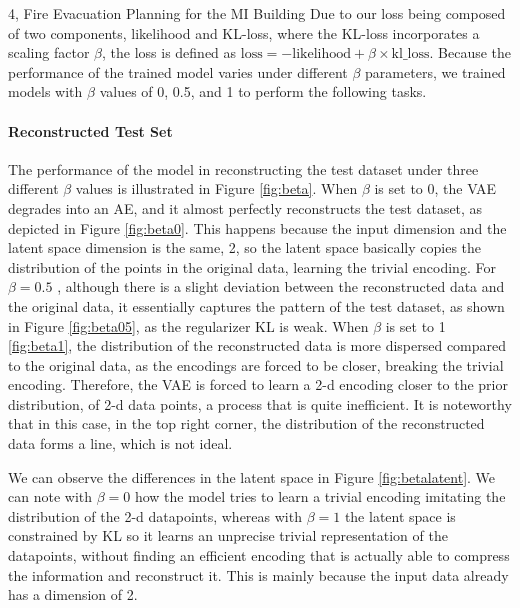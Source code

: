 \begin{task}{4, Fire Evacuation Planning for the MI Building}
Due to our loss being composed of two components, likelihood and KL-loss, where the KL-loss incorporates a scaling factor \(\beta\), the loss is defined as \( \text{loss} = - \text{likelihood} + \beta \times \text{kl\_loss} \). Because the performance of the trained model varies under different \(\beta\) parameters, we trained models with \(\beta\) values of 0, 0.5, and 1 to perform the following tasks.



\paragraph{Reconstructed Test Set}
The performance of the model in reconstructing the test dataset under three different \(\beta\) values is illustrated in Figure \ref{fig:beta}. When \(\beta\) is set to 0, the VAE degrades into an AE, and it almost perfectly reconstructs the test dataset, as depicted in Figure \ref{fig:beta0}. This happens because the input dimension and the latent space dimension is the same, 2, so the latent space basically copies the distribution of the points in the original data, learning the trivial encoding. For \(\beta = 0.5\) , although there is a slight deviation between the reconstructed data and the original data, it essentially captures the pattern of the test dataset, as shown in Figure \ref{fig:beta05}, as the regularizer KL is weak. When \(\beta\) is set to 1 \ref{fig:beta1}, the distribution of the reconstructed data is more dispersed compared to the original data, as the encodings are forced to be closer, breaking the trivial encoding. Therefore, the VAE is forced to learn a 2-d encoding closer to the prior distribution, of 2-d data points, a process that is quite inefficient. It is noteworthy that in this case, in the top right corner, the distribution of the reconstructed data forms a line, which is not ideal.

We can observe the differences in the latent space in Figure \ref{fig:betalatent}. We can note with \(\beta = 0\) how the model tries to learn a trivial encoding imitating the distribution of the 2-d datapoints, whereas with \(\beta = 1\) the latent space is constrained by KL so it learns an unprecise trivial representation of the datapoints, without finding an efficient encoding that is actually able to compress the information and reconstruct it. This is mainly because the input data already has a dimension of 2.


\begin{figure}[ht]
\centering


\end{figure}
\end{task}

